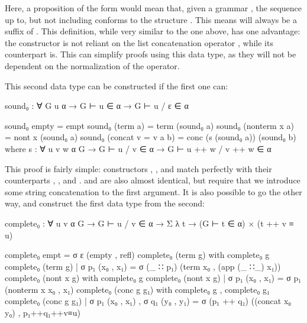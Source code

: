 	Here, a proposition of the form  would mean that,
	given a grammar , the sequence  up to, but not
	including  conforms to the structure . This means
	 will always be a suffix of . This definition, while
	very similar to the one above, has one advantage: the constructor
	 is not reliant on the list concatenation operator
	\codett{++}, while its counterpart  is. This can simplify
	proofs using this data type, as they will not be dependent on the
	normalization of the \codett{++} operator.

	This second data type can be constructed if the first one can:

	\begin{code}
		sound₀ :  ∀ {G u α} → G ⊢ u ∈ α → G ⊢ u / ε ∈ α

		sound₀ empty = empt
		sound₀ (term a) = term (sound₀ a)
		sound₀ (nonterm x a) = nont x (sound₀ a)
		sound₀ (concat {v = v} a b) = conc (s (sound₀ a)) (sound₀ b)
		  where
		    s : ∀ {u v w α G} →
		      G ⊢ u / v ∈ α →
		      G ⊢ u ++ w / v ++ w ∈ α
	\end{code}

	This proof is fairly simple: constructors , ,
	and  match perfectly with their counterparts ,
	, and .  and  are
	also almost identical, but require that we introduce some string
	concatenation to the first argument. It is also possible to go the other
	way, and construct the first data type from the second:

	\begin{code}
		complete₀ : ∀ {u v α G} → G ⊢ u / v ∈ α →
		  Σ λ t → (G ⊢ t ∈ α) × (t ++ v ≡ u)

		complete₀ empt = σ ε (empty , refl)
		complete₀ (term g) with complete₀ g
		complete₀ (term g) | σ p₁ (x₀ , x₁) = σ (_ ∷ p₁) (term x₀ , (app (_ ∷_) x₁))
		complete₀ (nont x g) with complete₀ g
		complete₀ (nont x g) | σ p₁ (x₀ , x₁) = σ p₁ (nonterm x x₀ , x₁)
		complete₀ (conc g g₁) with complete₀ g , complete₀ g₁
		complete₀ (conc g g₁) | σ p₁ (x₀ , x₁) , σ q₁ (y₀ , y₁) =
		  σ (p₁ ++ q₁) ((concat x₀ y₀) , p₁++q₁++v≡u)
	\end{code}

